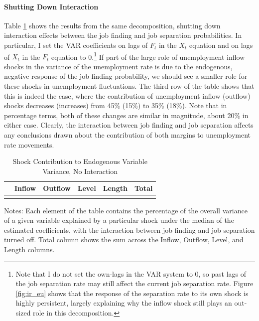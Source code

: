 \documentclass[12pt]{article}
\newcommand{\inputpath}{../output/tables/}
\begin{document}
\paragraph{Shutting Down Interaction} Table \ref{tab:shock_contribution_noint} shows the results from the same decomposition, shutting down interaction effects between the job finding and job separation probabilities. In particular, I set the VAR coefficients on lags of $F_t$ in the $X_t$ equation and on lags of $X_t$ in the $F_t$ equation to 0.\footnote{Note that I do not set the own-lags in the VAR system to 0, so past lags of the job separation rate may still affect the current job separation rate. Figure \ref{fig:ir_eu} shows that the response of the separation rate to its own shock is highly persistent, largely explaining why the inflow shock still plays an out-sized role in this decomposition.} If part of the large role of unemployment inflow shocks in the variance of the unemployment rate is due to the endogenous, negative response of the job finding probability, we should see a smaller role for these shocks in unemployment fluctuations. The third row of the table shows that this is indeed the case, where the contribution of unemployment inflow (outflow) shocks decreases (increases) from 45\% (15\%) to 35\% (18\%). Note that in percentage terms, both of these changes are similar in magnitude, about 20\% in either case. Clearly, the interaction between job finding and job separation affects any conclusions drawn about the contribution of both margins to unemployment rate movements.

\begin{table}[t!]
\centering
\caption{Shock Contribution to Endogenous Variable Variance, No Interaction}\label{tab:shock_contribution_noint}
\begin{threeparttable}\small
\begin{tabular}{l | c c c c | c}
\toprule
& Inflow & Outflow & Level & Length & Total \\\hline
& & & & & \\[-0.25cm]

\bottomrule
\end{tabular}
\begin{tablenotes}\footnotesize
Notes: Each element of the table contains the percentage of the overall variance of a given variable explained by a particular shock under the median of the estimated coefficients, with the interaction between job finding and job separation turned off. Total column shows the sum across the Inflow, Outflow, Level, and Length columns.
\end{tablenotes}
\end{threeparttable}
\end{table}
\end{document}
